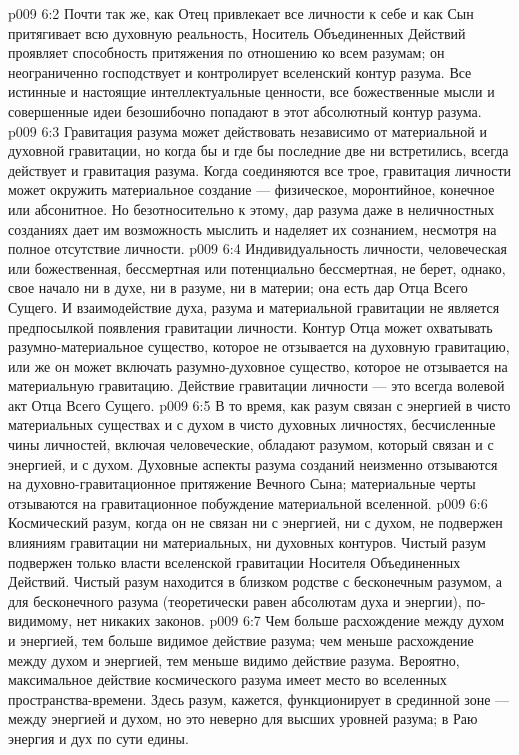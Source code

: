\vs p009 6:2 Почти так же, как Отец привлекает все личности к себе и как Сын притягивает всю духовную реальность, Носитель Объединенных Действий проявляет способность притяжения по отношению ко всем разумам; он неограниченно господствует и контролирует вселенский контур разума. Все истинные и настоящие интеллектуальные ценности, все божественные мысли и совершенные идеи безошибочно попадают в этот абсолютный контур разума.
\vs p009 6:3 \pc Гравитация разума может действовать независимо от материальной и духовной гравитации, но когда бы и где бы последние две ни встретились, всегда действует и гравитация разума. Когда соединяются все трое, гравитация личности может окружить материальное создание --- физическое, моронтийное, конечное или абсонитное. Но безотносительно к этому, дар разума даже в неличностных созданиях дает им возможность мыслить и наделяет их сознанием, несмотря на полное отсутствие личности.
\vs p009 6:4 \pc Индивидуальность личности, человеческая или божественная, бессмертная или потенциально бессмертная, не берет, однако, свое начало ни в духе, ни в разуме, ни в материи; она есть дар Отца Всего Сущего. И взаимодействие духа, разума и материальной гравитации не является предпосылкой появления гравитации личности. Контур Отца может охватывать разумно\hyp{}материальное существо, которое не отзывается на духовную гравитацию, или же он может включать разумно\hyp{}духовное существо, которое не отзывается на материальную гравитацию. Действие гравитации личности --- это всегда волевой акт Отца Всего Сущего.
\vs p009 6:5 В то время, как разум связан с энергией в чисто материальных существах и с духом в чисто духовных личностях, бесчисленные чины личностей, включая человеческие, обладают разумом, который связан и с энергией, и с духом. Духовные аспекты разума созданий неизменно отзываются на духовно\hyp{}гравитационное притяжение Вечного Сына; материальные черты отзываются на гравитационное побуждение материальной вселенной.
\vs p009 6:6 \pc Космический разум, когда он не связан ни с энергией, ни с духом, не подвержен влияниям гравитации ни материальных, ни духовных контуров. Чистый разум подвержен только власти вселенской гравитации Носителя Объединенных Действий. Чистый разум находится в близком родстве с бесконечным разумом, а для бесконечного разума (теоретически равен абсолютам духа и энергии), по\hyp{}видимому, нет никаких законов.
\vs p009 6:7 Чем больше расхождение между духом и энергией, тем больше видимое действие разума; чем меньше расхождение между духом и энергией, тем меньше видимо действие разума. Вероятно, максимальное действие космического разума имеет место во вселенных пространства\hyp{}времени. Здесь разум, кажется, функционирует в срединной зоне --- между энергией и духом, но это неверно для высших уровней разума; в Раю энергия и дух по сути едины.
